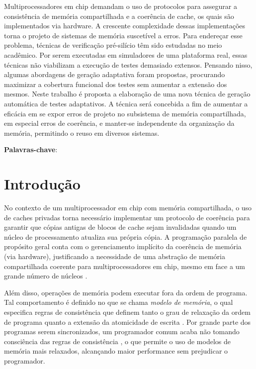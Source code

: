\documentclass{ufsc-thesis} %
\begin{document}
\begin{resumo}
    \small
    Multiprocessadores em chip demandam o uso de protocolos para assegurar a
    consistência de memória compartilhada e a coerência de cache, os quais são
    implementados via hardware. A crescente complexidade dessas implementações
    torna o projeto de sistemas de memória suscetível a erros. Para endereçar
    esse problema, técnicas de verificação pré-silício têm sido estudadas no
    meio acadêmico. Por serem executadas em simuladores de uma plataforma real,
    essas técnicas não viabilizam a execução de testes demasiado extensos.
    Pensando nisso, algumas abordagens de geração adaptativa foram propostas,
    procurando maximizar a cobertura funcional dos testes sem aumentar a
    extensão dos mesmos. Neste trabalho é proposta a elaboração de uma nova
    técnica de geração automática de testes adaptativos. A técnica será
    concebida a fim de aumentar a eficácia em se expor erros de projeto no
    subsistema de memória compartilhada, em especial erros de coerência, e
    manter-se independente da organização da memória, permitindo o reuso em
    diversos sistemas.

    \vspace{\onelineskip}
    \noindent
    \textbf{Palavras-chave}: \listaassuntos
\end{resumo}

\clearpage
\newpage
\clearpage
\newpage

\tableofcontents

\chapter{Introdução}

No contexto de um multiprocessador em chip com memória compartilhada, o uso de
caches privadas torna necessário implementar um protocolo de coerência para
garantir que cópias antigas de blocos de cache sejam invalidadas quando um
núcleo de processamento atualiza sua própria cópia.  A programação paralela de
propósito geral conta com o gerenciamento implícito da coerência de memória
(via hardware), justificando a necessidade de uma abstração de memória
compartilhada coerente para multiprocessadores em chip, mesmo em face a um
grande número de núcleos \cite{Devadas:2013}.

Além disso, operações de memória podem executar fora da ordem de programa. Tal
comportamento é definido no que se chama \textit{modelo de memória}, o qual
especifica regras de consistência que definem tanto o grau de relaxação da
ordem de programa quanto a extensão da atomicidade de escrita \cite{Adve:1996}.
Por grande parte dos programas serem sincronizados, um programador comum acaba
não tomando consciência das regras de consistência \cite{Hennessy:2011}, o que
permite o uso de modelos de memória mais relaxados, alcançando maior
performance sem prejudicar o programador.
\end{document}
